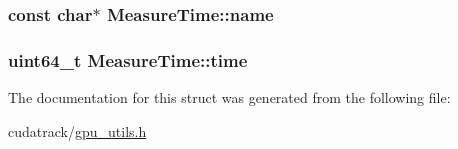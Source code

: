 \subsubsection[{\texorpdfstring{name}{name}}]{\setlength{\rightskip}{0pt plus 5cm}const char$\ast$ Measure\+Time\+::name}\hypertarget{struct_measure_time_abeec392149eb49701448e4ebaf790eb3}{}\label{struct_measure_time_abeec392149eb49701448e4ebaf790eb3}
\subsubsection[{\texorpdfstring{time}{time}}]{\setlength{\rightskip}{0pt plus 5cm}uint64\+\_\+t Measure\+Time\+::time}\hypertarget{struct_measure_time_a43445cf3256b5569bf80085bb078c7be}{}\label{struct_measure_time_a43445cf3256b5569bf80085bb078c7be}


The documentation for this struct was generated from the following file\+:\begin{DoxyCompactItemize}
\item 
cudatrack/\hyperlink{gpu__utils_8h}{gpu\+\_\+utils.\+h}\end{DoxyCompactItemize}
